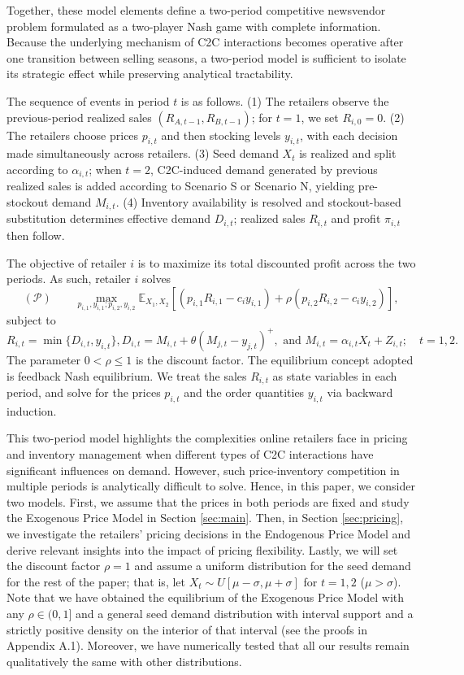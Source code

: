 \documentclass[nonblindrev,copyedit]{informs1}
\begin{document}
Together, these model elements define a two-period competitive newsvendor problem formulated as a two-player Nash game with complete information. Because the underlying mechanism of C2C interactions becomes operative after one transition between selling seasons, a two-period model is sufficient to isolate its strategic effect while preserving analytical tractability.

The sequence of events in period $t$ is as follows. (1) The retailers observe the previous-period realized sales $(R_{A,t-1},R_{B,t-1})$; for $t=1$, we set $R_{i,0}=0$. (2) The retailers choose prices $p_{i,t}$ and then stocking levels $y_{i,t}$, with each decision made simultaneously across retailers. (3) Seed demand $X_t$ is realized and split according to $\alpha_{i,t}$; when $t=2$, C2C-induced demand generated by previous realized sales is added according to Scenario S or Scenario N, yielding pre-stockout demand $M_{i,t}$. (4) Inventory availability is resolved and stockout-based substitution determines effective demand $D_{i,t}$; realized sales $R_{i,t}$ and profit $\pi_{i,t}$ then follow.

The objective of retailer $i$ is to maximize its total discounted profit across the two periods. As such, retailer $i$ solves
\[
 (\mathcal{P}) \qquad   \max_{p_{i,1},y_{i,1}; p_{i,2},y_{i,2}} \mathbb{E}_{X_1,X_2} \left[ \left( p_{i,1}R_{i,1}-c_iy_{i,1} \right) +\rho\left( p_{i,2}R_{i,2}-c_iy_{i,2} \right) \right] ,
\]
subject to
\[
R_{i,t}=\min\{D_{i,t}, y_{i,t}\},  D_{i,t}=M_{i,t}+\theta (M_{j,t}-y_{j,t})^+,  \mbox{ and } M_{i,t} = \alpha_{i,t} X_t + Z_{i,t}; \quad t=1, 2.
\]
The parameter $0<\rho\leq 1$ is the discount factor. The equilibrium concept adopted is feedback Nash equilibrium. We treat the sales $R_{i,t}$ as state variables in each period, and solve for the prices $p_{i,t}$ and the order quantities $y_{i,t}$ via backward induction.

This two-period model highlights the complexities online retailers face in pricing and inventory management when different types of C2C interactions have significant influences on demand.
However, such price-inventory competition in multiple periods is analytically difficult to solve. Hence, in this paper, we consider two models. First, we assume that the prices in both periods are fixed and study the Exogenous Price Model in Section \ref{sec:main}. Then, in Section \ref{sec:pricing}, we investigate the retailers' pricing decisions in the Endogenous Price Model and derive relevant insights into the impact of pricing flexibility. Lastly, we will set the discount factor $\rho=1$ and assume a uniform distribution for the seed demand for the rest of the paper; that is, let $X_t\sim U[\mu-\sigma,\mu+\sigma]$ for $t=1,2$ ($\mu > \sigma$). Note that we have obtained the equilibrium of the Exogenous Price Model with any $\rho\in(0,1]$ and a general seed demand distribution with interval support and a strictly positive density on the interior of that interval (see the proofs in Appendix A.1). Moreover, we have numerically tested that all our results remain qualitatively the same with other distributions.
\end{document}
